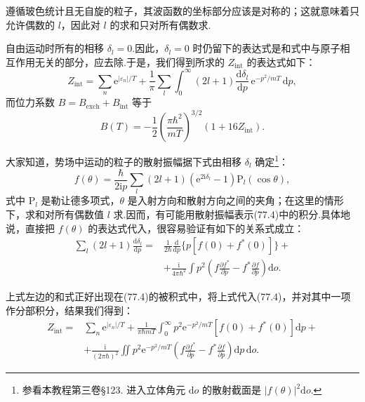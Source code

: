 遵循玻色统计且无自旋的粒子，其波函数的坐标部分应该是对称的；这就意味着只允许偶数的 $l$，因此对 $l$ 的求和只对所有偶数求.

自由运动时所有的相移 $\delta_l=0$.因此，$\delta_l=0$ 时仍留下的表达式是和式中与原子相互作用无关的部分，应去除.于是，我们得到所求的 $Z_{\mathrm{int}}$ 的表达式如下：
\begin{equation}
  Z_{\mathrm{int}}=\sum_n\mathrm{e}^{|\varepsilon_n|/T}
  +\frac{1}{\pi}\sum_l\int_0^{\infty}(2l+1)\frac{\mathrm{d}\delta_l}{\mathrm{d}p}\,
  \mathrm{e}^{-p^2/mT}\,\mathrm{d}p,
\end{equation}
而位力系数 $B=B_{\mathrm{exch}}+B_{\mathrm{int}}$ 等于
\begin{equation}
  B(T)=-\frac{1}{2}\left(\frac{\pi\hbar^2}{mT}\right)^{3/2}
  \left(1+16Z_{\mathrm{int}}\right).
\end{equation}

大家知道，势场中运动的粒子的散射振幅据下式由相移 $\delta_l$ 确定\footnote{参看本教程第三卷§123. 进入立体角元 $\mathrm{d}o$ 的散射截面是 $\left|f(\theta)\right|^2\mathrm{d}o$.}：
\begin{equation*}
  f(\theta)=\frac{\hbar}{2\mathrm{i}p}\sum_l(2l+1)
  \left(\mathrm{e}^{2\mathrm{i}\delta_l}-1\right)\mathrm{P}_l(\cos\theta),
\end{equation*}
式中 $\mathrm{P}_l$ 是勒让德多项式，$\theta$ 是入射方向和散射方向之间的夹角；在这里的情形下，求和对所有偶数值 $l$ 求.因而，有可能用散射振幅表示(77.4)中的积分.具体地说，直接把 $f(\theta)$ 的表达式代入，很容易验证有如下的关系式成立：
\begin{equation*}
\begin{aligned}
  \sum_l(2l+1)\frac{\mathrm{d}\delta_l}{\mathrm{d}p}
  ={}&\frac{1}{2\hbar}\frac{\mathrm{d}}{\mathrm{d}p}
  \bigl\{p\left[f(0)+f^{*}(0)\right]\bigr\}+\\
  &+\frac{\mathrm{i}}{4\pi\hbar^2}\int p^2
  \left(f\frac{\partial f^{*}}{\partial p}
  -f^{*}\frac{\partial f}{\partial p}\right)\mathrm{d}o.
\end{aligned}
\end{equation*}

上式左边的和式正好出现在(77.4)的被积式中，将上式代入(77.4)，并对其中一项作分部积分，结果我们得到：
\begin{equation}
\begin{aligned}
  Z_{\mathrm{int}}={}&\sum_n\mathrm{e}^{|\varepsilon_n|/T}
  +\frac{1}{\pi\hbar mT}\int_0^{\infty}p^2\mathrm{e}^{-p^2/mT}
  \left[f(0)+f^{*}(0)\right]\mathrm{d}p+\\
  &+\frac{\mathrm{i}}{(2\pi\hbar)^2}\iint p^2\mathrm{e}^{-p^2/mT}
  \left(f\frac{\partial f^{*}}{\partial p}
  -f^{*}\frac{\partial f}{\partial p}\right)\mathrm{d}p\,\mathrm{d}o.
\end{aligned}
\end{equation}

